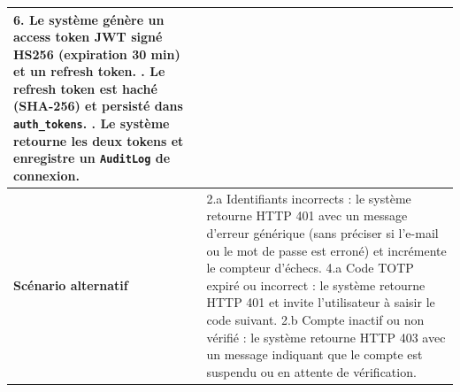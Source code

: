 \begin{table}[H]
\begin{tabularx}{\textwidth}{>{\bfseries}p{3.5cm} X}
6. Le système génère un access token JWT signé HS256 (expiration 30 min) et un refresh token. \newline
7. Le refresh token est haché (SHA-256) et persisté dans \texttt{auth\_tokens}. \newline
8. Le système retourne les deux tokens et enregistre un \texttt{AuditLog} de connexion. \\
\hline
Scénario alternatif &
2.a Identifiants incorrects : le système retourne HTTP 401 avec un message d'erreur générique (sans préciser si l'e-mail ou le mot de passe est erroné) et incrémente le compteur d'échecs. \newline
4.a Code TOTP expiré ou incorrect : le système retourne HTTP 401 et invite l'utilisateur à saisir le code suivant. \newline
2.b Compte inactif ou non vérifié : le système retourne HTTP 403 avec un message indiquant que le compte est suspendu ou en attente de vérification. \\
\hline
\end{tabularx}
\end{table}

